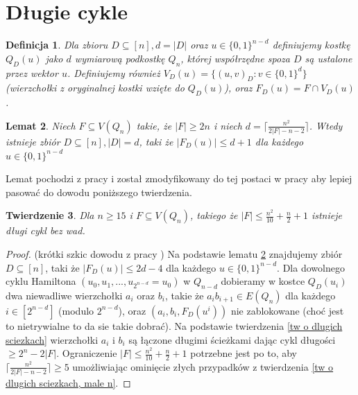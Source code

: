 \documentclass{pracamgr}
\newtheorem{theorem}{Twierdzenie}[chapter]
\newtheorem{defi}[theorem]{Definicja} %
\newtheorem{lemma}[theorem]{Lemat}
\begin{document}
  \section{Długie cykle}
   \begin{defi}\label{przekrój kostki}
    Dla zbioru $D\subseteq[n], d=|D|$ oraz $u\in\{0,1\}^{n-d}$ definiujemy kostkę $Q_D(u)$ jako $d$ wymiarową podkostkę $Q_n$, której współrzędne spoza $D$
    są ustalone przez wektor $u$. Definiujemy również $V_D(u)=\{(u,v)_D:v\in\{0,1\}^d\}$ (wierzchołki z oryginalnej kostki wzięte do $Q_D(u)$), oraz
    $F_D(u)=F\cap V_D(u)$.
   \end{defi}
   \begin{lemma}\label{dlugi cykl - podzial kostki}
    Niech $F\subseteq V(Q_n)$ takie, że $|F|\ge 2n$ i niech $d=\lceil\frac{n^2}{2|F|-n-2}\rceil$.
    Wtedy istnieje zbiór $D\subseteq[n],|D|=d$, taki że $|F_D(u)|\le d+1$ dla każdego $u\in\{0,1\}^{n-d}$
   \end{lemma}
   Lemat pochodzi z pracy \cite{Wie} i został zmodyfikowany do tej postaci w pracy \cite{FG} aby lepiej pasować do dowodu poniższego twierdzenia.
   \begin{theorem}\label{dlugi cykl - tw}
    Dla $n\ge15$ i $F\subseteq V(Q_n)$, takiego że $|F|\le\frac{n^2}{10}+\frac{n}{2}+1$ istnieje długi cykl bez wad.
   \end{theorem}
   \begin{proof}
    (krótki szkic dowodu z pracy \cite{FG})\newline
    Na podstawie lematu \ref{dlugi cykl - podzial kostki} znajdujemy zbiór $D\subseteq[n]$, taki że $|F_D(u)|\le 2d-4$ dla każdego $u\in\{0,1\}^{n-d}$.
    Dla dowolnego cyklu Hamiltona $(u_0,u_1,...,u_{2^{n-d}}=u_0)$ w $Q_{n-d}$ dobieramy w kostce $Q_D(u_i)$ dwa niewadliwe
    wierzchołki $a_i$ oraz $b_i$, takie że $a_ib_{i+1}\in E(Q_n)$ dla każdego $i\in[2^{n-d}]$ (modulo $2^{n-d}$),
    oraz $(a_i,b_i,F_D(u^i))$ nie zablokowane (choć jest to nietrywialne to da sie takie dobrać).
    Na podstawie twierdzenia \ref{tw o dlugich sciezkach} wierzchołki $a_i$ i $b_i$ są łączone długimi ścieżkami dając cykl długości $\ge 2^n-2|F|$.
    Ograniczenie $|F|\le\frac{n^2}{10}+\frac{n}{2}+1$ potrzebne jest po to, aby $\lceil\frac{n^2}{2|F|-n-2}\rceil\ge5$ umożliwiając ominięcie złych
    przypadków z twierdzenia \ref{tw o dlugich sciezkach, male n}.
   \end{proof}
\end{document}
